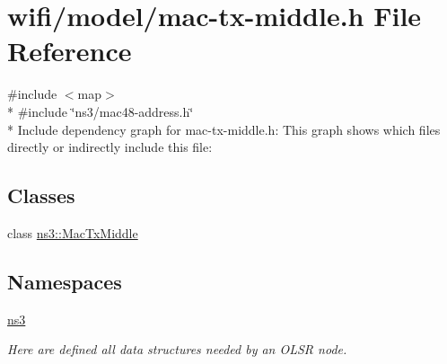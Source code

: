 \hypertarget{mac-tx-middle_8h}{}\section{wifi/model/mac-\/tx-\/middle.h File Reference}
\label{mac-tx-middle_8h}
{\ttfamily \#include $<$map$>$}\\*
{\ttfamily \#include \char`\"{}ns3/mac48-\/address.\+h\char`\"{}}\\*
Include dependency graph for mac-\/tx-\/middle.h\+:
This graph shows which files directly or indirectly include this file\+:
\subsection*{Classes}
\begin{DoxyCompactItemize}
\item 
class \hyperlink{classns3_1_1MacTxMiddle}{ns3\+::\+Mac\+Tx\+Middle}
\end{DoxyCompactItemize}
\subsection*{Namespaces}
\begin{DoxyCompactItemize}
\item 
 \hyperlink{namespacens3}{ns3}
\begin{DoxyCompactList}\small\item\em Here are defined all data structures needed by an O\+L\+SR node. \end{DoxyCompactList}\end{DoxyCompactItemize}
